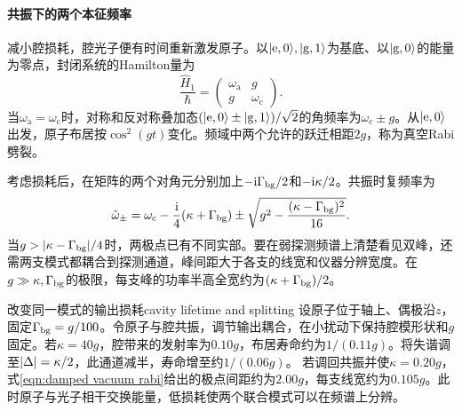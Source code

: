 \paragraph{共振下的两个本征频率}
减小腔损耗，腔光子便有时间重新激发原子。以$\lvert\mathrm{e},0\rangle,\lvert\mathrm{g},1\rangle$为基底、以$\lvert\mathrm{g},0\rangle$的能量为零点，封闭系统的Hamilton量为
\begin{equation}
    \label{eq:ed-single-excitation-hamiltonian}
    \frac{\hat H_1}{\hbar} =
    \begin{pmatrix}\omega_{\mathrm{a}}&g\\g&\omega_{\mathrm{c}}\end{pmatrix}.
\end{equation}
当$\omega_{\mathrm{a}} = \omega_{\mathrm{c}}$时，对称和反对称叠加态$(\lvert\mathrm{e},0\rangle \pm \lvert\mathrm{g},1\rangle)/\sqrt 2$的角频率为$\omega_{\mathrm{c}} \pm g$。从$\lvert\mathrm{e},0\rangle$出发，原子布居按$\cos^2(gt)$变化。频域中两个允许的跃迁相距$2g$，称为真空Rabi劈裂。

考虑损耗后，在矩阵的两个对角元分别加上$-\mathrm{i}\Gamma_{\rm bg}/2$和$-\mathrm{i}\kappa/2$。共振时复频率为
\begin{equation}
    \tilde\omega_\pm = \omega_{\mathrm{c}} - \frac{\mathrm{i}}{4}(\kappa + \Gamma_{\rm bg})
       \pm \sqrt{g^2 - \frac{(\kappa - \Gamma_{\rm bg})^2}{16}} .
    \label{eqn:damped vacuum rabi}
\end{equation}
当$g > \lvert\kappa - \Gamma_{\rm bg}\rvert/4$时，两极点已有不同实部。要在弱探测频谱上清楚看见双峰，还需两支模式都耦合到探测通道，峰间距大于各支的线宽和仪器分辨宽度。在$g \gg \kappa,\Gamma_{\rm bg}$的极限，每支峰的功率半高全宽约为$(\kappa + \Gamma_{\rm bg})/2$。

\begin{example}{改变同一模式的输出损耗}{cavity lifetime and splitting}
    设原子位于轴上、偶极沿$z$，固定$\Gamma_{\rm bg} = g/100$。令原子与腔共振，调节输出耦合，在小扰动下保持腔模形状和$g$固定。若$\kappa = 40g$，腔带来的发射率为$0.10g$，布居寿命约为$1/(0.11g)$。将失谐调至$\lvert\Delta\rvert = \kappa/2$，此通道减半，寿命增至约$1/(0.06g)$。
    若调回共振并使$\kappa = 0.20g$，式\eqref{eqn:damped vacuum rabi}给出的极点间距约为$2.00g$，每支线宽约为$0.105g$。此时原子与光子相干交换能量，低损耗使两个联合模式可以在频谱上分辨。
\end{example}

